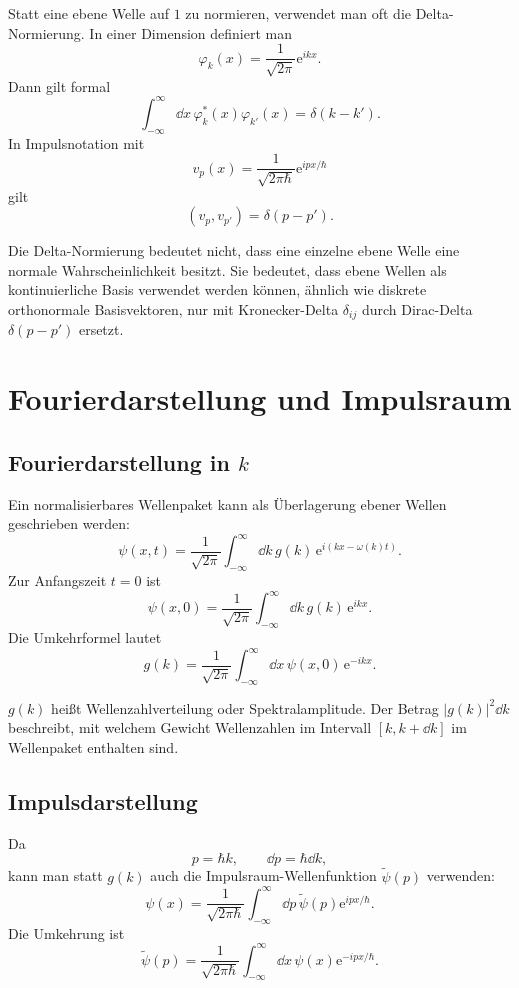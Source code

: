 Statt eine ebene Welle auf $1$ zu normieren, verwendet man oft die Delta-Normierung. In einer Dimension definiert man
\[
    \varphi_k(x)=\frac{1}{\sqrt{2\pi}}\mathrm{e}^{ikx}.
\]
Dann gilt formal
\[
    \int_{-\infty}^{\infty}\dd x\,\varphi_k^*(x)\varphi_{k'}(x)
    =\delta(k-k').
\]
In Impulsnotation mit
\[
    v_p(x)=\frac{1}{\sqrt{2\pi\hbar}}\mathrm{e}^{ipx/\hbar}
\]
gilt
\[
    (v_p,v_{p'})=\delta(p-p').
\]

\begin{conceptbox}
Die Delta-Normierung bedeutet nicht, dass eine einzelne ebene Welle eine normale Wahrscheinlichkeit besitzt. Sie bedeutet, dass ebene Wellen als kontinuierliche Basis verwendet werden können, ähnlich wie diskrete orthonormale Basisvektoren, nur mit Kronecker-Delta $\delta_{ij}$ durch Dirac-Delta $\delta(p-p')$ ersetzt.
\end{conceptbox}

\section{Fourierdarstellung und Impulsraum}

\subsection{Fourierdarstellung in $k$}

Ein normalisierbares Wellenpaket kann als Überlagerung ebener Wellen geschrieben werden:
\[
    \psi(x,t)
    =\frac{1}{\sqrt{2\pi}}\int_{-\infty}^{\infty}\dd k\,
    g(k)\,\mathrm{e}^{i(kx-\omega(k)t)}.
\]
Zur Anfangszeit $t=0$ ist
\[
    \psi(x,0)=\frac{1}{\sqrt{2\pi}}\int_{-\infty}^{\infty}\dd k\,
    g(k)\,\mathrm{e}^{ikx}.
\]
Die Umkehrformel lautet
\[
    g(k)=\frac{1}{\sqrt{2\pi}}\int_{-\infty}^{\infty}\dd x\,
    \psi(x,0)\,\mathrm{e}^{-ikx}.
\]

\begin{definitionbox}
$g(k)$ heißt Wellenzahlverteilung oder Spektralamplitude. Der Betrag $|g(k)|^2\dd k$ beschreibt, mit welchem Gewicht Wellenzahlen im Intervall $[k,k+\dd k]$ im Wellenpaket enthalten sind.
\end{definitionbox}

\subsection{Impulsdarstellung}

Da
\[
    p=\hbar k,
    \qquad
    \dd p=\hbar\dd k,
\]
kann man statt $g(k)$ auch die Impulsraum-Wellenfunktion $\widetilde{\psi}(p)$ verwenden:
\[
    \psi(x)=\frac{1}{\sqrt{2\pi\hbar}}
    \int_{-\infty}^{\infty}\dd p\,
    \widetilde{\psi}(p)\mathrm{e}^{ipx/\hbar}.
\]
Die Umkehrung ist
\[
    \widetilde{\psi}(p)=\frac{1}{\sqrt{2\pi\hbar}}
    \int_{-\infty}^{\infty}\dd x\,
    \psi(x)\mathrm{e}^{-ipx/\hbar}.
\]

